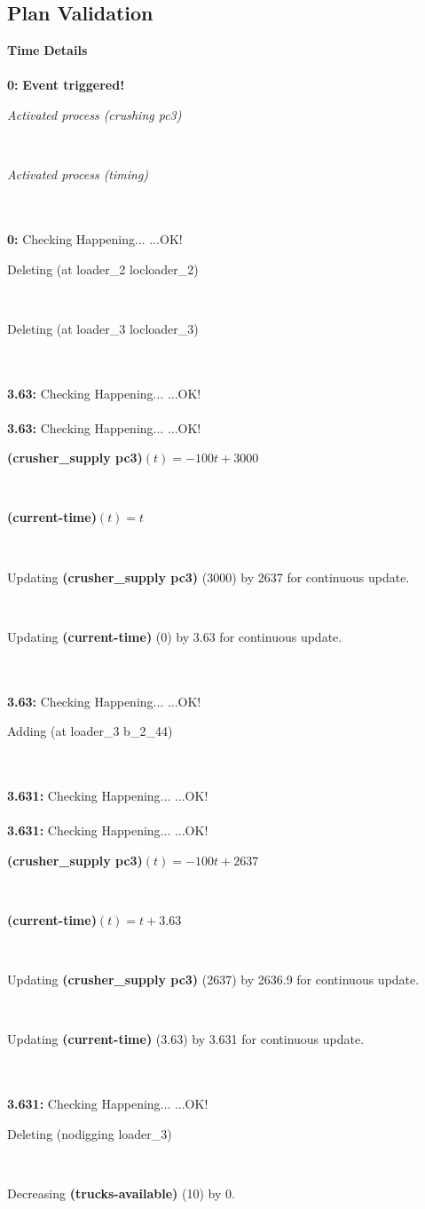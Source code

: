 \documentclass[a4paper,12pt]{article}
\newcommand{\headingtimedetails}{{\bf Time} \qquad \= {\bf Details}\\[0.8ex]}
\newcommand{\atime}[1]{{\bf #1:}}
\newcommand{\action}[1]{{\sf #1}}
\newcommand{\exprn}[1]{{\sf #1}}
\newcommand{\fexprn}[1]{{\small {\bf #1}}}
\newcommand{\checkhappening}{Checking Happening... }
\newcommand{\eventtriggered}{{\bf Event triggered!}}
\newcommand{\listrow}[1]{\begin{minipage}[t]{11.5cm} #1 \end{minipage}}
\newcommand{\happeningOK}{...OK!}
\newcommand{\aprocessactivated}[1]{\listrow{{\it Activated process #1} }}
\newcommand{\assignmentcts}[3]{\listrow{Updating \fexprn{#1} (#2) by #3 for continuous update.}}
\newcommand{\decrease}[3]{\listrow{Decreasing \fexprn{#1} (#2) by #3.}}
\newcommand{\function}[2]{\listrow{\fexprn{#1}$(t) = #2$}}
\newcommand{\adding}[1]{\listrow{Adding \exprn{#1} }}
\newcommand{\deleting}[1]{\listrow{Deleting \exprn{#1} }}
\begin{document}
\subsection{Plan Validation}
\begin{tabbing}
\headingtimedetails 
\\
 \atime{0} \> \eventtriggered \\
\> \aprocessactivated{\action{(crushing pc3)}}\\
\> \aprocessactivated{\action{(timing)}}\\
\\
\atime{0} \> \checkhappening\happeningOK\\
 \> \deleting{(at loader\_2 locloader\_2)}\\
 \> \deleting{(at loader\_3 locloader\_3)}\\
\\
\atime{3.63} \> \checkhappening\happeningOK\\
\\
\atime{3.63} \> \checkhappening\happeningOK\\
 \> \function{(crusher\_supply pc3)}{ - 100t + 3000}\\
 \> \function{(current-time)}{t}\\
 \> \assignmentcts{(crusher\_supply pc3)}{3000}{2637}\\
 \> \assignmentcts{(current-time)}{0}{3.63}\\
\\
\atime{3.63} \> \checkhappening\happeningOK\\
 \> \adding{(at loader\_3 b\_2\_44)}\\
\\
\atime{3.631} \> \checkhappening\happeningOK\\
\\
\atime{3.631} \> \checkhappening\happeningOK\\
 \> \function{(crusher\_supply pc3)}{ - 100t + 2637}\\
 \> \function{(current-time)}{t + 3.63}\\
 \> \assignmentcts{(crusher\_supply pc3)}{2637}{2636.9}\\
 \> \assignmentcts{(current-time)}{3.63}{3.631}\\
\\
\atime{3.631} \> \checkhappening\happeningOK\\
 \> \deleting{(nodigging loader\_3)}\\
 \> \decrease{(trucks-available)}{10}{0}\\
\\

\end{tabbing}
\end{document}
